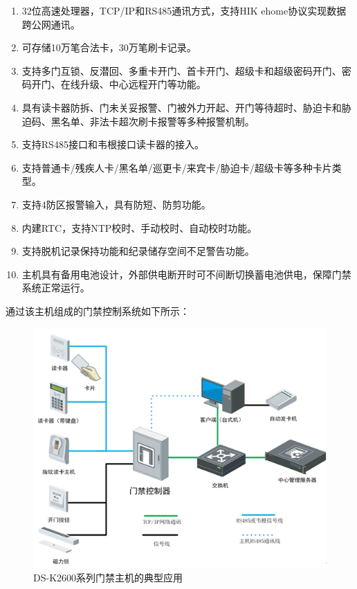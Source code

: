 \documentclass{gdutart}
\begin{document}
      \begin{enumerate}[label={(\arabic*)}]
        \item 32位高速处理器，TCP/IP和RS485通讯方式，支持HIK ehome协议实现数据跨公网通讯。
        \item 可存储10万笔合法卡，30万笔刷卡记录。
        \item 支持多门互锁、反潜回、多重卡开门、首卡开门、超级卡和超级密码开门、密码开门、在线升级、中心远程开门等功能。
        \item 具有读卡器防拆、门未关妥报警、门被外力开起、开门等待超时、胁迫卡和胁迫码、黑名单、非法卡超次刷卡报警等多种报警机制。
        \item 支持RS485接口和韦根接口读卡器的接入。
        \item 支持普通卡/残疾人卡/黑名单/巡更卡/来宾卡/胁迫卡/超级卡等多种卡片类型。
        \item 支持4防区报警输入，具有防短、防剪功能。
        \item 内建RTC，支持NTP校时、手动校时、自动校时功能。
        \item 支持脱机记录保持功能和纪录储存空间不足警告功能。
        \item 主机具有备用电池设计，外部供电断开时可不间断切换蓄电池供电，保障门禁系统正常运行。
      \end{enumerate}

      通过该主机组成的门禁控制系统如下所示：
      \begin{figure}[htpb]
        \begin{center}
          \includegraphics[scale=0.8]{img/access_control.png}
        \end{center}
        \caption{DS-K2600系列门禁主机的典型应用}\label{fig:fig2}
      \end{figure}
\end{document}
